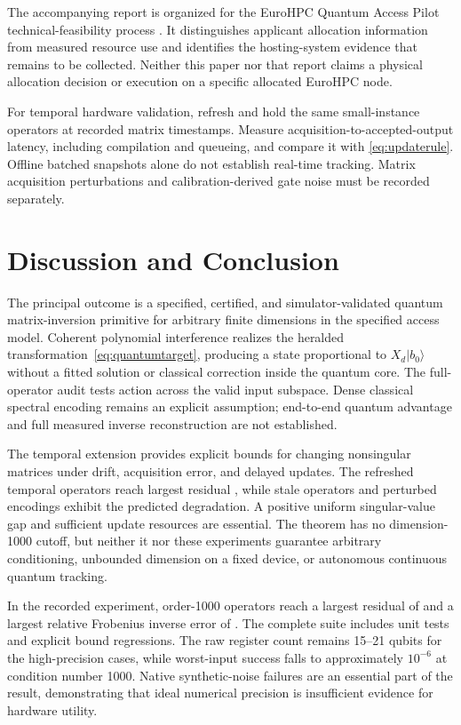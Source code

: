 \documentclass[journal]{IEEEtran}
\newcommand{\ket}[1]{\lvert#1\rangle}
\begin{document}
The accompanying report is organized for the EuroHPC Quantum Access Pilot
technical-feasibility process \cite{eurohpc2026}. It distinguishes applicant
allocation information from measured resource use and identifies the
hosting-system evidence that remains to be collected. Neither this paper
nor that report claims a physical allocation decision or execution on a
specific allocated EuroHPC node.

For temporal hardware validation, refresh and hold the same small-instance
operators at recorded matrix timestamps. Measure acquisition-to-accepted-output
latency, including compilation and queueing, and compare it with
\eqref{eq:updaterule}. Offline batched snapshots alone do not establish
real-time tracking. Matrix acquisition perturbations and calibration-derived
gate noise must be recorded separately.

\section{Discussion and Conclusion}
The principal outcome is a specified, certified, and simulator-validated
quantum matrix-inversion primitive for arbitrary finite dimensions in the
specified access model. Coherent polynomial interference
realizes the heralded transformation~\eqref{eq:quantumtarget}, producing
a state proportional to $X_d\ket{b_0}$ without a fitted solution or
classical correction inside the quantum core. The full-operator audit
tests action across the valid input subspace. Dense classical spectral
encoding remains an explicit assumption; end-to-end quantum advantage
and full measured inverse reconstruction are not established.

The temporal extension provides explicit bounds for changing nonsingular
matrices under drift, acquisition error, and delayed updates. The
\TimeVaryingSnapshotCount{} refreshed temporal operators reach largest
residual \TimeVaryingWorstFreshResidual{}, while stale operators and
perturbed encodings exhibit the predicted degradation. A positive uniform
singular-value gap and sufficient update resources are essential. The
theorem has no dimension-1000 cutoff, but neither it nor these experiments
guarantee arbitrary conditioning, unbounded dimension on a fixed device,
or autonomous continuous quantum tracking.

In the recorded experiment, \PrecisionCaseCount{} order-1000 operators
reach a largest residual of \WorstOperatorResidual{} and a largest relative
Frobenius inverse error of \WorstInverseError{}. The complete suite includes
\TestCount{} unit tests and explicit bound regressions. The raw register
count remains 15--21 qubits for the high-precision cases, while worst-input
success falls to approximately $10^{-6}$ at condition number 1000.
Native synthetic-noise failures are an essential part of the result,
demonstrating that ideal numerical precision is insufficient evidence
for hardware utility.
\end{document}
